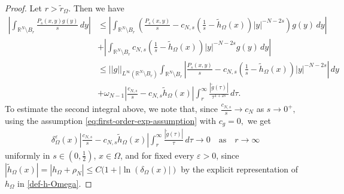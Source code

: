 \documentclass[notitlepage,11pt,reqno]{amsart}
\theoremstyle{definition}
\numberwithin{equation}{section}
\newcommand{\eps}{{\varepsilon}}
\newcommand{\RR}{\mathds{R}}
\begin{document}
\begin{proof}
Let $r> \tilde{r}_\Omega.$ Then we have
\begin{align*}
\left|\int_{\RR^N\setminus B_r}\frac{P_s(x, y)g(y)}{s}\, dy\right|
&\leq \left|\int_{\RR^N\setminus B_r}\left(\frac{P_s(x, y)}{s}-c_{N, s}\left(\frac{1}{s}-\tilde h_{\Omega}(x)\right)|y|^{-N-2s}\right)g(y)\, dy\right|\\
&+ \left|\int_{\RR^N\setminus B_r}c_{N, s}\left(\frac{1}{s}-\tilde h_{\Omega}(x)\right)|y|^{-N-2s}g(y)\,dy\right|\\
&\leq ||g||_{L^{\infty}(\RR^N\setminus B_r)}\int_{\RR^N\setminus B_r}\left|\frac{P_s(x, y)}{s}-c_{N, s}\left(\frac{1}{s}-\tilde h_{\Omega}(x)\right)|y|^{-N-2s}\right|\, dy\\
&+\omega_{N-1}\left|\frac{c_{N, s}}{s}-c_{N, s}\tilde h_{\Omega}(x)\right|\int_{r}^{\infty}\frac{|\tilde g(\tau)|}{\tau^{1+2s}}\, d\tau.
\end{align*}
To estimate the second integral above, we note that, since $\frac{c_{N, s}}{s}\to c_{N}$ as $s\to 0^+,$ using the assumption \eqref{eq:first-order-exp-assumption} with $c_g=0,$ we get
\begin{align*}
    \delta^{\eps}_{\Omega}(x)\left|\frac{c_{N, s}}{s}-c_{N, s}\tilde h_{\Omega}(x)\right|\int_{r}^{\infty}\frac{|\tilde g(\tau)|}{\tau}\, d\tau \to 0\quad \text{as}\quad r \to \infty
\end{align*}
uniformly in $s\in (0, \frac{1}{2})$, $x\in \Omega$, and for fixed every $\eps>0$, since $|\tilde h_{\Omega}(x)|=|h_{\Omega}+\rho_N|\leq C(1+|\ln(\delta_{\Omega}(x)|)$ by the explicit representation of $h_{\Omega}$ in \eqref{def-h-Omega}.


\end{proof}
\end{document}
